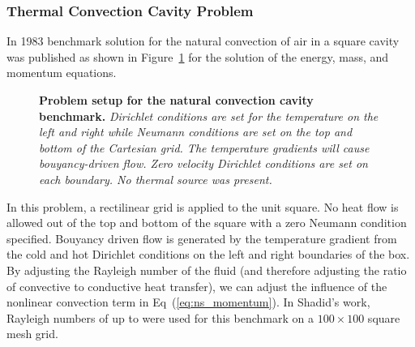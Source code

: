 \subsubsection{Thermal Convection Cavity Problem}
\label{subsubsec:natural_convection_cavity}
In 1983 benchmark solution for the natural convection of air in a
square cavity was published \citep{de_vahl_davis_natural_1983} as
shown in Figure~\ref{fig:natural_convection_cavity} for the solution
of the energy, mass, and momentum equations.
\begin{figure}[htpb!]
  \begin{center}
    \scalebox{1.5}{
       }
  \end{center}
  \caption{\textbf{Problem setup for the natural convection cavity
      benchmark.} \textit{Dirichlet conditions are set for the
      temperature on the left and right while Neumann conditions are
      set on the top and bottom of the Cartesian grid. The temperature
      gradients will cause bouyancy-driven flow. Zero velocity
      Dirichlet conditions are set on each boundary. No thermal source
      was present.}}
  \label{fig:natural_convection_cavity}
\end{figure}
In this problem, a rectilinear grid is applied to the unit square. No
heat flow is allowed out of the top and bottom of the square with a
zero Neumann condition specified. Bouyancy driven flow is generated by
the temperature gradient from the cold and hot Dirichlet conditions on
the left and right boundaries of the box. By adjusting the Rayleigh
number of the fluid (and therefore adjusting the ratio of convective
to conductive heat transfer), we can adjust the influence of the
nonlinear convection term in Eq~(\ref{eq:ns_momentum}). In Shadid's
work, Rayleigh numbers of up to  were used for this benchmark
on a $100 \times 100$ square mesh grid.

